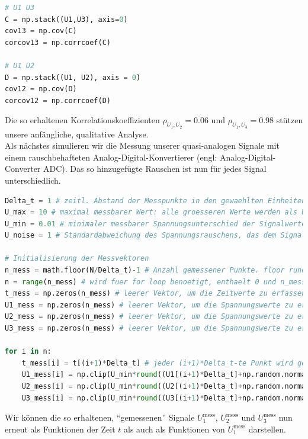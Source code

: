 \begin{lstlisting}[language = Python]
# U1 U3 
C = np.stack((U1,U3), axis=0)
cov13 = np.cov(C)
corcov13 = np.corrcoef(C)

# U1 U2
D = np.stack((U1, U2), axis = 0)
cov12 = np.cov(D)
corcov12 = np.corrcoef(D)
\end{lstlisting}

Die so erhaltenen Korrelationskoeffizienten $\rho_{U_1, U_2}=0.06$ und $\rho_{U_1, U_3}=0.98$ stützen unsere anfängliche, qualitative Analyse. \\

Als nächstes simulieren wir die Messung unserer quasi-analogen Signale mit einem rauschbehafteten Analog-Digital-Konvertierer (engl: Analog-Digital-Converter ADC). Das so hinzugefügte Rauschen ist nun für jedes Signal unterschiedlich. 
\begin{lstlisting}[language = Python]
Delta_t = 1 # zeitl. Abstand der Messpunkte in den gewaehlten Einheiten: fuer einen Zeitvektor t mit Abstaenden von je 1 Nanosekunde misst unser ADC einen Datenpunkt alle Delta_t Nanosekunden
U_max = 10 # maximal messbarer Wert: alle groesseren Werte werden als U_max angezeigt (clipping)
U_min = 0.01 # minimaler messbarer Spannungsunterschied der Signalwerte: Spannungsaufloesung des ADC
U_noise = 1 # Standardabweichung des Spannungsrauschens, das dem Signal durch den Messprozess hinzugefuegt wird

# Initialisierung der Messvektoren
n_mess = math.floor(N/Delta_t)-1 # Anzahl gemessener Punkte. floor rundet ab
n = range(n_mess) # wird fuer for loop benoetigt, enthaelt 0 und n_mess als untere und obere Grenze von n
t_mess = np.zeros(n_mess) # leerer Vektor, um die Zeitwerte zu erfassen
U1_mess = np.zeros(n_mess) # leerer Vektor, um die Spannungswerte zu erfassen
U2_mess = np.zeros(n_mess) # leerer Vektor, um die Spannungswerte zu erfassen
U3_mess = np.zeros(n_mess) # leerer Vektor, um die Spannungswerte zu erfassen

for i in n:
    t_mess[i] = t[(i+1)*Delta_t] # jeder (i+1)*Delta_t-te Punkt wird gemessen
    U1_mess[i] = np.clip(U_min*round((U1[(i+1)*Delta_t]+np.random.normal(0,U_noise))/U_min,0),-U_max,U_max) # numpy.clip limitiert die maximalen Werte auf [-U_max,U_max]
    U2_mess[i] = np.clip(U_min*round((U2[(i+1)*Delta_t]+np.random.normal(0,U_noise))/U_min,0),-U_max,U_max) # numpy.clip limitiert die maximalen Werte auf [-U_max,U_max]
    U3_mess[i] = np.clip(U_min*round((U3[(i+1)*Delta_t]+np.random.normal(0,U_noise))/U_min,0),-U_max,U_max) # numpy.clip limitiert die maximalen Werte auf [-U_max,U_max]
\end{lstlisting}
Wir können die so erhaltenen, ``gemessenen'' Signale $U_1^{\mathrm{mess}}$, $U_2^{\mathrm{mess}}$ und $U_3^{\mathrm{mess}}$ nun erneut als Funktionen der Zeit $t$ als auch als Funktionen von $U_1^{\mathrm{mess}}$ darstellen. 

